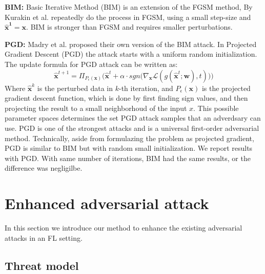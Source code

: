 \textbf{BIM:}  Basic Iterative Method (BIM) is an extension of the FGSM method, By Kurakin et al.\cite{kurakin2018adversarial} repeatedly do the process in FGSM, using a small step-size and $\bm{\hat{x}^{1}} = \bm{x}$. BIM is stronger than FGSM and requires smaller perturbations.

\textbf{PGD:} Madry et al. \cite{madry2017towards}proposed their own version of the BIM attack. In Projected Gradient Descent (PGD) \cite{madry2018towards}
the attack starts with a uniform random initialization. The update formula for PGD attack can be written as: 
\begin{equation}
\label{eqt:pgd}
    \bm{\hat{x}}^{t+1}=\Pi_{P_\epsilon(\bm{x})} \Big( \bm{\hat{x}}^t + \alpha \cdot sgn\big(\nabla_{\bm{x}}{\mathcal{L}}(g(\bm{\hat{x}}^t;\bm{w}),t)\big)\Big)
\end{equation}
Where $\bm{\hat{x}}^{k}$ is the perturbed data in $k$-th iteration, and $P_\epsilon(\bm{x})$ is the projected gradient descent function, which is done by first finding sign values, and then projecting the result to a small neighborhoud of the input ${x}$. This possible parameter spaces determines the set PGD attack samples that an adverdsary can use. PGD is one of the strongest attacks and is a universal first-order adversarial method. Technically, aside from formulazing the problem as projected gradient, PGD is similar to BIM but with random small initialization. We report results with PGD. With same number of iterations, BIM had the same results, or the difference was negligilbe.
	
\section{Enhanced adversarial attack }
\label{sec:ourattack}
In this section we introduce our method to enhance the existing adversarial attacks in an FL setting.

\subsection{Threat model}



